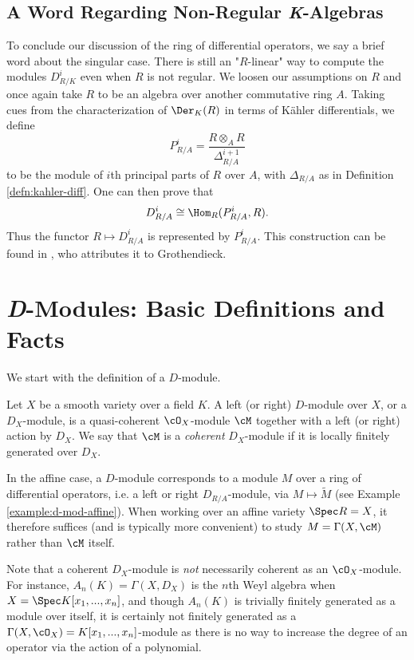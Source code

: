 \subsection{A Word Regarding Non-Regular \textit{K}-Algebras}
To conclude our discussion of the ring of differential operators, we say a brief word about the singular case. There is still an "$R$-linear" way to compute the modules $D^i_{R/K}$  even when $R$ is not regular. We loosen our assumptions on $R$ and once again take $R$ to be an algebra over another commutative ring $A$. Taking cues from the characterization of $\Der_K(R)$ in terms of K\"ahler differentials, we define
\begin{equation}\label{eqn:principal-parts}
	P^i_{R/A} = \frac{R\otimes_A R}{\Delta^{i+1}_{R/A}}
\end{equation}
to be the module of $i$th principal parts of $R$ over $A$, with $\Delta_{R/A}$ as in Definition \ref{defn:kahler-diff}. One can then prove that
\begin{align*}
	D^i_{R/A} \cong \Hom_R(P^i_{R/A}, R).
\end{align*}
Thus the functor $R\mapsto D^i_{R/A}$ is represented by $P^i_{R/A}$. This construction can be found in \cite{jet-spaces-exposition}, who attributes it to Grothendieck.

\newpage 

\section{\textit{D}-Modules: Basic Definitions and Facts}
\noindent We start with the definition of a $D$-module.
\begin{defn}\label{defn:D-modules}
	Let $X$ be a smooth variety over a field $K$. A left (or right) $D$-module over $X$, or a $D_X$-module, is a quasi-coherent $\cO_X$-module $\cM$ together with a left (or right) action by $D_X$. We say that $\cM$ is a \emph{coherent} $D_X$-module if it is locally finitely generated over $D_X$.
\end{defn}
In the affine case, a $D$-module corresponds to a module $M$ over a ring of differential operators, i.e. a left or right $D_{R/A}$-module, via $M\mapsto \tilde{M}$ (see Example \ref{example:d-mod-affine}). When working over an affine variety $\Spec R = X$, it therefore suffices (and is typically more convenient) to study $M = \Gamma(X,\cM)$ rather than $\cM$ itself.

Note that a coherent $D_X$-module is \emph{not} necessarily coherent as an $\cO_X$-module. For instance, $A_n(K) = \Gamma(X,D_X)$ is the $n$th Weyl algebra when $X = \Spec K[x_1,...,x_n]$, and though $A_n(K)$ is trivially finitely generated as a module over itself, it is certainly not finitely generated as a $\Gamma(X,\cO_X) = K[x_1,...,x_n]$-module as there is no way to increase the degree of an operator via the action of a polynomial.

